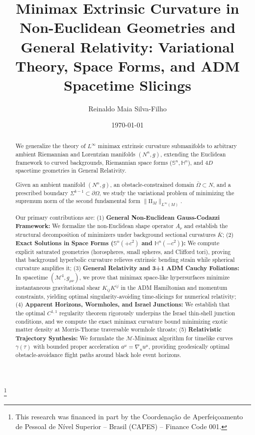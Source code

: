 \documentclass[11pt,reqno]{amsart}
\theoremstyle{definition}
\providecommand{\Hyp}{\mathbb{H}}
\providecommand{\Sph}{\mathbb{S}}
\providecommand{\II}{\mathrm{I\!I}}
\numberwithin{equation}{section}
\providecommand{\Hyp}{\mathbb{H}}
\providecommand{\Sph}{\mathbb{S}}
\providecommand{\II}{\mathrm{II}}
\begin{document}
\title[Minimax Curvature in Non-Euclidean Geometries and General Relativity]{Minimax Extrinsic Curvature in Non-Euclidean Geometries and General Relativity: Variational Theory, Space Forms, and ADM Spacetime Slicings}

\author{Reinaldo Maia Silva-Filho}
\address{Programa de P\'os-Gradua\c{c}\~ao em Estat\'istica e Experimenta\c{c}\~ao Agropecu\'aria (PPGEEAA/DES) \\
Universidade Federal de Lavras (UFLA), Lavras, MG, Brazil}
\thanks{This research was financed in part by the Coordena\c{c}\~ao de Aperfei\c{c}oamento de Pessoal de N\'ivel Superior -- Brasil (CAPES) -- Finance Code 001.}

\date{\today}

\begin{abstract}
We generalize the theory of $L^\infty$ minimax extrinsic curvature submanifolds to arbitrary ambient Riemannian and Lorentzian manifolds $(N^n, g)$, extending the Euclidean framework to curved backgrounds, Riemannian space forms ($\Sph^n, \Hyp^n$), and $4D$ spacetime geometries in General Relativity.

Given an ambient manifold $(N^n, g)$, an obstacle-constrained domain $\bar{\Omega} \subset N$, and a prescribed boundary $\Sigma^{k-1} \subset \partial\Omega$, we study the variational problem of minimizing the supremum norm of the second fundamental form $\|\II_M\|_{L^\infty(M)}$. 

Our primary contributions are:
(1) \textbf{General Non-Euclidean Gauss-Codazzi Framework:} We formalize the non-Euclidean shape operator $A_\nu$ and establish the structural decomposition of minimizers under background sectional curvatures $\bar{K}$;
(2) \textbf{Exact Solutions in Space Forms ($\Sph^n(+c^2)$ and $\Hyp^n(-c^2)$):} We compute explicit saturated geometries (horospheres, small spheres, and Clifford tori), proving that background hyperbolic curvature relieves extrinsic bending strain while spherical curvature amplifies it;
(3) \textbf{General Relativity and 3+1 ADM Cauchy Foliations:} In spacetime $(\mathcal{M}^4, g_{\mu\nu})$, we prove that minimax space-like hypersurfaces minimize instantaneous gravitational shear $K_{ij}K^{ij}$ in the ADM Hamiltonian and momentum constraints, yielding optimal singularity-avoiding time-slicings for numerical relativity;
(4) \textbf{Apparent Horizons, Wormholes, and Israel Junctions:} We establish that the optimal $C^{1,1}$ regularity theorem rigorously underpins the Israel thin-shell junction conditions, and we compute the exact minimax curvature bound minimizing exotic matter density at Morris-Thorne traversable wormhole throats;
(5) \textbf{Relativistic Trajectory Synthesis:} We formulate the $\mathcal{M}$-Minimax algorithm for timelike curves $\gamma(\tau)$ with bounded proper acceleration $a^\mu = \nabla_u u^\mu$, providing geodesically optimal obstacle-avoidance flight paths around black hole event horizons.
\end{abstract}
\end{document}
